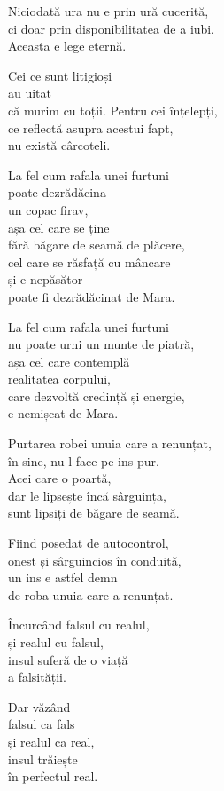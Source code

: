 Niciodată ura nu e prin ură cucerită,\\
ci doar prin disponibilitatea de a iubi.\\
Aceasta e lege eternă.

Cei ce sunt litigioși\\
au uitat\\
că murim cu toții.
Pentru cei înțelepți,\\
ce reflectă asupra acestui fapt,\\
nu există cârcoteli.

La fel cum rafala unei furtuni\\
poate dezrădăcina\\
un copac firav,\\
așa cel care se ține\\
fără băgare de seamă de plăcere,\\
cel care se răsfață cu mâncare\\
și e nepăsător\\
poate fi dezrădăcinat de Mara.


La fel cum rafala unei furtuni\\
nu poate urni un munte de piatră,\\
așa cel care contemplă\\
realitatea corpului,\\
care dezvoltă credință și energie,\\
e nemișcat de Mara.

Purtarea robei unuia care a renunțat,\\
în sine, nu-l face pe ins pur.\\
Acei care o poartă,\\
dar le lipsește încă sârguința,\\
sunt lipsiți de băgare de seamă.

Fiind posedat de autocontrol,\\
onest și sârguincios în conduită,\\
un ins e astfel demn\\
de roba unuia care a renunțat.


Încurcând falsul cu realul,\\
și realul cu falsul,\\
insul suferă de o viață\\
a falsității.


Dar văzând\\
falsul ca fals\\
și realul ca real,\\
insul trăiește\\
în perfectul real.


